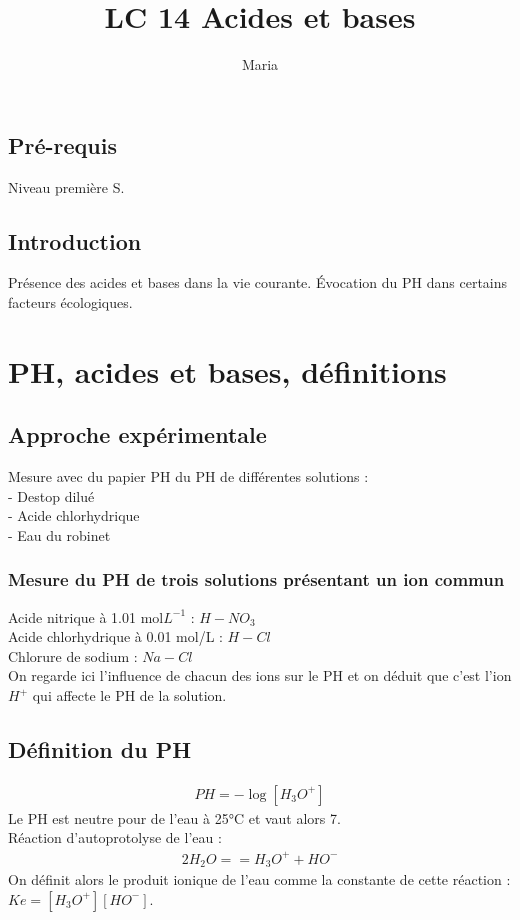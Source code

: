 \documentclass[12pt,prb,aps,epsf]{report}
\begin{document}
	
	\title{LC 14 Acides et bases}
	\author{Maria}
	
	\maketitle
	
	\tableofcontents
	
	\pagebreak
	
	
\subsection*{Pré-requis}
Niveau première S.

\subsection*{Introduction}
Présence des acides et bases dans la vie courante. Évocation du PH dans certains facteurs écologiques.

\section{PH, acides et bases, définitions}
\subsection{Approche expérimentale}

Mesure avec du papier PH du PH de différentes solutions :\\
	- Destop dilué\\
	- Acide chlorhydrique\\
	- Eau du robinet
	
\subsubsection{Mesure du PH de trois solutions présentant un ion commun}
Acide nitrique à 1.01 mol$L^{-1}$ : $H-NO_3$\\
Acide chlorhydrique à 0.01 mol/L : $H-Cl$\\ 
Chlorure de sodium : $Na-Cl$\\
On regarde ici l'influence de chacun des ions sur le PH et on déduit que c'est l'ion $H^+$ qui affecte le PH de la solution.

\subsection{Définition du PH}
\begin{eqnarray}
PH = -\log [H_3O^+]
\end{eqnarray}
Le PH est neutre pour de l'eau à 25°C et vaut alors 7.\\
Réaction d'autoprotolyse de l'eau :
\begin{eqnarray}
2H_2O = = H_3O^+ + HO^-
\end{eqnarray}
On définit alors le produit ionique de l'eau comme la constante de cette réaction : $Ke = [H_3O^+][HO^-]$.
\end{document}
